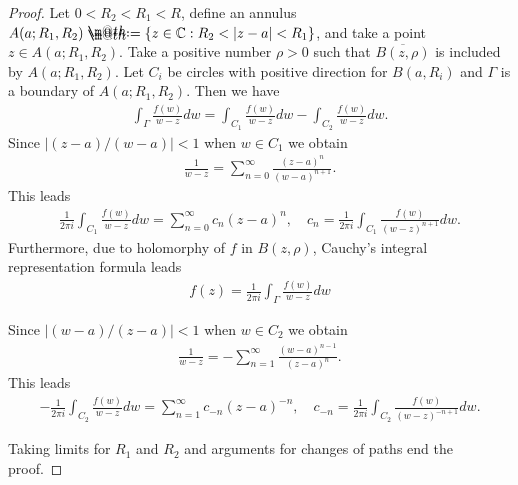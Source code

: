 \documentclass[openany, a4paper, oneside]{book}
\makeatletter
\newcommand*{\defeq}{\mathrel{\rlap{%
\raisebox{0.3ex}{$\m@th\cdot$}}%
\raisebox{-0.3ex}{$\m@th\cdot$}}%
=}
\theoremstyle{break}
\theoremstyle{breakdefn}
\newcommand{\abs}[1]{\left|#1\right|}
\newcommand{\set}[2]{\left\{#1 : #2\right\}}
\newcommand{\bbC}{\mathbb{C}}
\makeatother
\begin{document}
\begin{proof}
Let $0 < R_2 < R_1 < R$, define an annulus $A (a; R_1, R_2) \defeq \set{z \in \bbC}{R_2 < \abs{z - a} < R_1}$,
and take a point $z \in A (a; R_1, R_2)$.
Take a positive number $\rho > 0$ such that $\overline{B (z, \rho)}$ is included by $A (a; R_1, R_2)$.
Let $C_i$ be circles with positive direction for $B (a, R_i)$ and $\Gamma$ is a boundary of $A (a; R_1, R_2)$.
Then we have
\begin{align}
 \int_{\Gamma} \frac{f (w)}{w - z} dw
 =
 \int_{C_1} \frac{f (w)}{w - z} dw - \int_{C_2} \frac{f (w)}{w - z} dw.
\end{align}
Since $\abs{(z - a) / (w - a)} < 1$ when $w \in C_1$ we obtain
\begin{align}
 \frac{1}{w - z} = \sum_{n=0}^{\infty} \frac{(z - a)^n}{(w - a)^{n+1}}.
\end{align}
This leads
\begin{align}
 \frac{1}{2 \pi i} \int_{C_1} \frac{f (w)}{w - z} dw
 =
 \sum_{n=0}^{\infty} c_n (z - a)^n, \quad
 c_n
 =
 \frac{1}{2 \pi i} \int_{C_1} \frac{f (w)}{(w - z)^{n+1}} dw.
\end{align}
Furthermore, due to holomorphy of $f$ in $B (z, \rho)$, Cauchy's integral representation formula leads
\begin{align}
 f (z)
 =
 \frac{1}{2 \pi i} \int_{\Gamma} \frac{f (w)}{w - z} dw
\end{align}

Since $\abs{(w - a) / (z - a)} < 1$ when $w \in C_2$ we obtain
\begin{align}
 \frac{1}{w - z} = - \sum_{n=1}^{\infty} \frac{(w - a)^{n-1}}{(z - a)^{n}}.
\end{align}
This leads
\begin{align}
 -\frac{1}{2 \pi i} \int_{C_2} \frac{f (w)}{w - z} dw
 =
 \sum_{n=1}^{\infty} c_{-n} (z - a)^{-n}, \quad
 c_{-n}
 =
 \frac{1}{2 \pi i} \int_{C_2} \frac{f (w)}{(w - z)^{-n+1}} dw.
\end{align}

Taking limits for $R_1$ and $R_2$ and arguments for changes of paths end the proof.
\end{proof}
\end{document}
